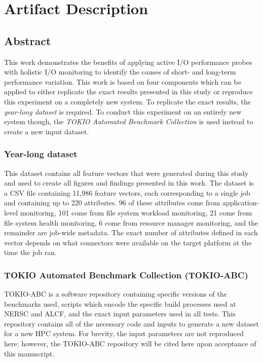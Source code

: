 \appendix

\section{Artifact Description} \label{sec:appendix/artifacts}

\subsection{Abstract}

This work demonstrates the benefits of applying active I/O performance probes with holistic I/O monitoring to identify the causes of short- and long-term performance variation.
This work is based on four components which can be applied to either replicate the exact results presented in this study or reproduce this experiment on a completely new system.
To replicate the exact results, the \emph{year-long dataset} is required.
To conduct this experiment on an entirely new system though, the \emph{TOKIO Automated Benchmark Collection} is used instead to create a new input dataset.

\subsubsection{Year-long dataset}

This dataset contains all feature vectors that were generated during this study and used to create all figures and findings presented in this work.
The dataset is a CSV file containing 11,986 feature vectors, each corresponding to a single job and containing up to 220 attributes.
96 of these attributes come from application-level monitoring, 101 come from file system workload monitoring, 21 come from file system health monitoring, 6 come from resource manager monitoring, and the remainder are job-wide metadata.
The exact number of attributes defined in each
vector depends on what connectors were available on the target platform at the time the job ran.


\subsubsection{TOKIO Automated Benchmark Collection (TOKIO-ABC)}

TOKIO-ABC is a software repository containing specific versions of the benchmarks used, scripts which encode the specific build processes used at NERSC and ALCF, and the exact input parameters used in all tests.
This repository contains all of the necessary code and inputs to generate a new dataset for a new HPC system.
For brevity, the input parameters are not reproduced here; however, the TOKIO-ABC repository will be cited here upon acceptance of this manuscript.

